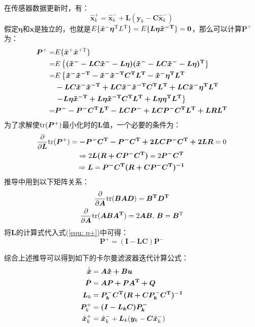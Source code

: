 在传感器数据更新时，有：
\begin{equation*}
    \hat{\bm{x}}^+_k = \hat{\bm{x}}^-_k + \bm{L} (\bm{y}_k - \bm{C} \hat{\bm{x}}^-_k)
\end{equation*}
假定$\bm{\eta}$和$\bm{x}$是独立的，也就是$E\{ \tilde{\bm{x}}^- \bm{\eta}^{\mathrm{T}} L^{\mathrm{T}}  \} = E\{\bm{ L\eta\tilde{x}^{-\mathrm{T}} }\} = \bm{0}$，那么可以计算$\bm{P}^+$为：
\begin{align}{\label{equ: p+}}
    \bm{P}^+ =& E\{ \tilde{\bm{x}}^+ \tilde{\bm{x}}^{+\mathrm{T}}   \} \notag \\
            =& E\left\{ \bm{ (\tilde{x}^- - LC\tilde{x}^- - L\eta) (\tilde{x}^- - LC\tilde{x}^- - L\eta)^{\mathrm{T}} } \right\}  \notag \\
            =& E\left\{\bm{ \tilde{x}^- \tilde{x}^{-\mathrm{T}} - \tilde{x}^- \tilde{x}^{-\mathrm{T}} C^{\mathrm{T}} L^{\mathrm{T}} - \tilde{x}^- \eta^{\mathrm{T}} L^{\mathrm{T}}}  \right. \notag \\
            & \bm{ - LC\tilde{x}^- \tilde{x}^{-\mathrm{T}} + LC \tilde{x}^- \tilde{x}^{-\mathrm{T}} C^{\mathrm{T}} L^{\mathrm{T}} + LC\tilde{x}^- \eta^{\mathrm{T}} L^{\mathrm{T}}}  \notag \\
            & \left. \bm{ - L \eta \tilde{x}^{-\mathrm{T}} + L \eta \tilde{x}^{-\mathrm{T}} C^{\mathrm{T}} L^{\mathrm{T}} + L \eta \eta^{\mathrm{T}} L^{\mathrm{T}} } \right\}  \notag \\
            =& \bm{ P^- - P^- C^{\mathrm{T}} L^{\mathrm{T}} - LCP^- + LCP^-C^{\mathrm{T}} L^{\mathrm{T}} + LRL^{\mathrm{T}} }
\end{align}
为了求解使$\mathrm{tr}(\bm{P}^+)$最小化时的$\bm{L}$值，一个必要的条件为：
\begin{gather*}
    \frac{\partial}{\partial \bm{L}} \mathrm{tr}(\bm{P}^+) = \bm{-P^- C^{\mathrm{T}} - P^- C^{\mathrm{T}} + 2LCP^-C^{\mathrm{T}} + 2LR} = 0 \\
    \Rightarrow 2 \bm{L(R + CP^-C^{\mathrm{T}})} = 2 \bm{P^-C^{\mathrm{T}}} \\
    \Rightarrow \bm{L} = \bm{P^- C^{\mathrm{T}}(R+CP^-C^{\mathrm{T}})^{-1}}
\end{gather*}
推导中用到以下矩阵关系：
\begin{gather*}
    \frac{\partial}{\partial \bm{A}} \mathrm{tr}(\bm{BAD}) = \bm{B^{\mathrm{T}} D^{\mathrm{T}}} \\
    \frac{\partial}{\partial \bm{A}} \mathrm{tr}(\bm{ABA^{\mathrm{T}}}) = 2 \bm{AB},\,\bm{B} = \bm{B}^{\mathrm{T}}
\end{gather*}
将$\bm{L}$的计算式代入式(\ref{equ: p+})中可得：
\begin{equation}
    \bm{P}^+ = \bm{(I - LC)P^-}
\end{equation}


综合上述推导可以得到如下的卡尔曼滤波器迭代计算公式：
\begin{align*}
     \dot{\hat{\bm{x}}} &= \bm{A \hat{x} + B u} \\
     \dot{\bm{P}} &= \bm{A P + P A^{\mathrm{T}} + Q} \\
     \bm{L}_k &= \bm{P^-_k C^{\mathrm{T}}(R+CP^-_k C^{\mathrm{T}})^{-1}} \\
     \bm{P}^+_k &= \bm{(I - L_k C)P^-_k} \\
     \hat{\bm{x}}^+_k &= \hat{\bm{x}}^-_k + \bm{L}_k (\bm{y}_k - \bm{C} \hat{\bm{x}}^-_k)
\end{align*}

